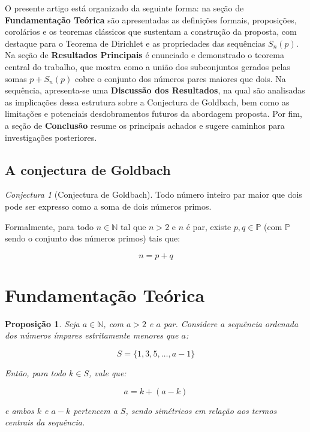 \documentclass[a4paper,11pt]{article}
\newtheorem{proposition}[theorem]{Proposição}
\theoremstyle{definition}
\theoremstyle{remark}
\newtheorem{conjecture}{Conjectura}
\begin{document}
\begin{otherlanguage}{brazil}
	O presente artigo está organizado da seguinte forma: na seção de \textbf{Fundamentação Teórica} são apresentadas as definições formais, proposições, corolários e os teoremas clássicos que sustentam a construção da proposta, com destaque para o Teorema de Dirichlet e as propriedades das sequências \(S_n(p)\). Na seção de \textbf{Resultados Principais} é enunciado e demonstrado o teorema central do trabalho, que mostra como a união dos subconjuntos gerados pelas somas \(p + S_n(p)\) cobre o conjunto dos números pares maiores que dois. Na sequência, apresenta-se uma \textbf{Discussão dos Resultados}, na qual são analisadas as implicações dessa estrutura sobre a Conjectura de Goldbach, bem como as limitações e potenciais desdobramentos futuros da abordagem proposta. Por fim, a seção de \textbf{Conclusão} resume os principais achados e sugere caminhos para investigações posteriores.

	
	\subsection*{A conjectura de Goldbach}
	\begin{conjecture}[Conjectura de Goldbach]
		Todo número inteiro par maior que dois pode ser expresso como a soma de dois números primos.
		
		Formalmente, para todo \(n \in \mathbb{N}\) tal que \(n > 2\) e \(n\) é par, existe \(p, q \in \mathbb{P}\) (com \(\mathbb{P}\) sendo o conjunto dos números primos) tais que:
		
		\[
		n = p + q
		\]
		
	\end{conjecture}
	
	
	\section{Fundamentação Teórica}
	
	\begin{proposition}
		Seja $a \in \mathbb{N}$, com $a > 2$ e $a$ par. Considere a sequência ordenada dos números ímpares estritamente menores que $a$:
		
		\[
		S = \{1, 3, 5, \dotsc, a - 1\}
		\]
		
		Então, para todo $k \in S$, vale que:
		
		\[
		a = k + (a - k)
		\]
		
		e ambos $k$ e $a - k$ pertencem a $S$, sendo simétricos em relação aos termos centrais da sequência.
	\end{proposition}
	

\end{otherlanguage}
\end{document}
